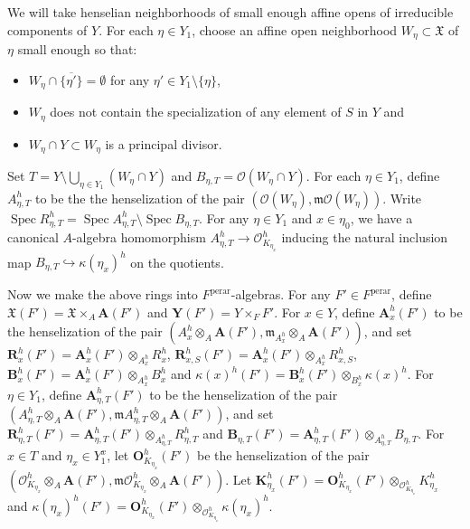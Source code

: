 \documentclass{amsart}
\theoremstyle{remark}
\numberwithin{equation}{subsection}
\newcommand{\Order}{\mathcal{O}}
\newcommand{\into}{\hookrightarrow}
\newcommand{\tensor}{\mathbin{\otimes}}
\newcommand{\closure}[1]{\overline{#1}}
\newcommand{\perar}{\mathrm{perar}}
\newcommand{\alg}[1]{\mathbf{#1}}
\newcommand{\ideal}[1]{\mathfrak{#1}}
\newcommand{\algfrak}[1]{\bm{\mathfrak{#1}}}
\DeclareMathOperator{\Spec}{Spec}
\begin{document}
We will take henselian neighborhoods of small enough affine opens
of irreducible components of $Y$.
For each $\eta \in Y_{1}$,
choose an affine open neighborhood $W_{\eta} \subset \mathfrak{X}$ of $\eta$
small enough so that:
\begin{itemize}
	\item \label{0298}
		$W_{\eta} \cap \closure{\{\eta'\}} = \emptyset$
		for any $\eta' \in Y_{1} \setminus \{\eta\}$,
	\item \label{0299}
		$W_{\eta}$ does not contain the specialization of any element of $S$ in $Y$ and
	\item \label{0300}
		$W_{\eta} \cap Y \subset W_{\eta}$ is a principal divisor.
\end{itemize}
Set $T = Y \setminus \bigcup_{\eta \in Y_{1}} (W_{\eta} \cap Y)$
and $B_{\eta, T} = \Order(W_{\eta} \cap Y)$.
For each $\eta \in Y_{1}$,
define $A_{\eta, T}^{h}$ to be the the henselization of the pair
$(\Order(W_{\eta}), \ideal{m} \Order(W_{\eta}))$.
Write $\Spec R_{\eta, T}^{h} = \Spec A_{\eta, T}^{h} \setminus \Spec B_{\eta, T}$.
For any $\eta \in Y_{1}$ and $x \in \eta_{0}$,
we have a canonical $A$-algebra homomorphism
$A_{\eta, T}^{h} \to \Order_{K_{\eta_{x}}}^{h}$
inducing the natural inclusion map
$B_{\eta, T} \into \kappa(\eta_{x})^{h}$ on the quotients.

Now we make the above rings into $F^{\perar}$-algebras.
For any $F' \in F^{\perar}$,
define $\algfrak{X}(F') = \mathfrak{X} \times_{A} \alg{A}(F')$
and $\alg{Y}(F') = Y \times_{F} F'$.
For $x \in Y$, define $\alg{A}_{x}^{h}(F')$ to be the henselization of the pair
$(A_{x}^{h} \tensor_{A} \alg{A}(F'), \ideal{m}_{A_{x}^{h}} \tensor_{A} \alg{A}(F'))$,
and set $\alg{R}_{x}^{h}(F') = \alg{A}_{x}^{h}(F') \tensor_{A_{x}^{h}} R_{x}^{h}$,
$\alg{R}_{x, S}^{h}(F') = \alg{A}_{x}^{h}(F') \tensor_{A_{x}^{h}} R_{x, S}^{h}$,
$\alg{B}_{x}^{h}(F') = \alg{A}_{x}^{h}(F') \tensor_{A_{x}^{h}} B_{x}^{h}$
and $\algfrak{\kappa}(x)^{h}(F') = \alg{B}_{x}^{h}(F') \tensor_{B_{x}^{h}} \kappa(x)^{h}$.
For $\eta \in Y_{1}$,
define $\alg{A}_{\eta, T}^{h}(F')$ to be the henselization of the pair
$(A_{\eta, T}^{h} \tensor_{A} \alg{A}(F'), \ideal{m} A_{\eta, T}^{h} \tensor_{A} \alg{A}(F'))$,
and set $\alg{R}_{\eta, T}^{h}(F') = \alg{A}_{\eta, T}^{h}(F') \tensor_{A_{\eta, T}^{h}} R_{\eta, T}^{h}$
and $\alg{B}_{\eta, T}(F') = \alg{A}_{\eta, T}^{h}(F') \tensor_{A_{\eta, T}^{h}} B_{\eta, T}$.
For $x \in T$ and $\eta_{x} \in Y_{1}^{x}$,
let $\alg{O}_{K_{\eta_{x}}}^{h}(F')$ be the henselization of the pair
$(\Order_{K_{\eta_{x}}}^{h} \tensor_{A} \alg{A}(F'), \ideal{m} \Order_{K_{\eta_{x}}}^{h} \tensor_{A} \alg{A}(F'))$.
Let $\alg{K}_{\eta_{x}}^{h}(F') = \alg{O}_{K_{\eta_{x}}}^{h}(F') \tensor_{\Order_{K_{\eta_{x}}}^{h}} K_{\eta_{x}}^{h}$
and $\algfrak{\kappa}(\eta_{x})^{h}(F') = \alg{O}_{K_{\eta_{x}}}^{h}(F') \tensor_{\Order_{K_{\eta_{x}}}^{h}} \kappa(\eta_{x})^{h}$.
\end{document}
